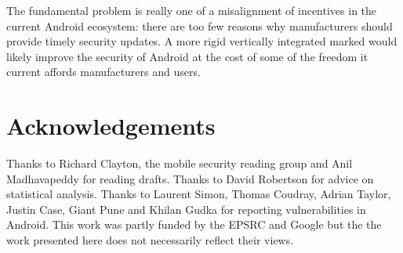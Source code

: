 \documentclass{llncs}
\newcommand{\identifying}[1]{#1}%
\begin{document}
The fundamental problem is really one of a misalignment of incentives in the current Android ecosystem: there are too few reasons why manufacturers should provide timely security updates.
A more rigid vertically integrated marked would likely improve the security of Android at the cost of some of the freedom it current affords manufacturers and users.

\identifying{
\section*{Acknowledgements}
Thanks to Richard Clayton, the mobile security reading group and Anil Madhavapeddy for reading drafts.
Thanks to David Robertson for advice on statistical analysis.
Thanks to Laurent Simon, Thomas Coudray, Adrian Taylor, Justin Case, Giant Pune and Khilan Gudka for reporting vulnerabilities in Android.
This work was partly funded by the EPSRC and Google but the the work presented here does not necessarily reflect their views.
}

\printbibliography
\end{document}
